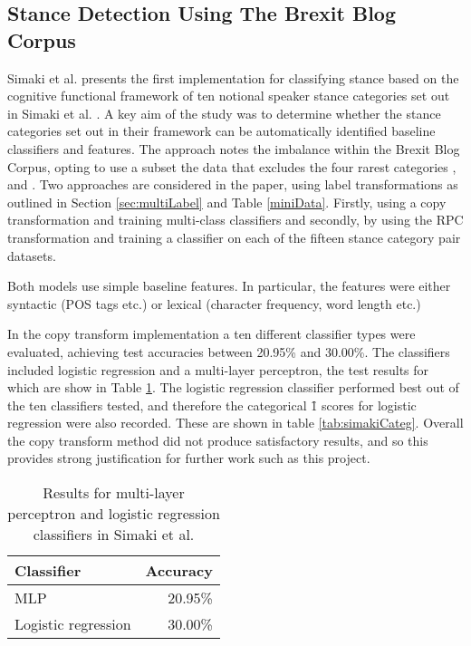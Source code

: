 \documentclass[Dissertation.tex]{subfiles}
\begin{document}
\subsection{Stance Detection Using The Brexit Blog Corpus}
Simaki et al. \cite{simakiStanceClassificationTexts2017} presents the first implementation for classifying stance based on the cognitive functional framework of ten notional speaker stance categories set out in Simaki et al. \cite{simakiAnnotatingSpeakerStance2017}. A key aim of the study was to determine whether the stance categories set out in their framework can be automatically identified baseline classifiers and features. The approach notes the imbalance within the Brexit Blog Corpus, opting to use a subset the data that excludes the four rarest categories ,  and . Two approaches are considered in the paper, using label transformations as outlined in  Section \ref{sec:multiLabel} and Table \ref{miniData}. Firstly, using a copy transformation and training multi-class classifiers and secondly, by using the RPC transformation and training a classifier on each of the fifteen stance category pair datasets. 

Both models use simple baseline features. In particular, the features were either syntactic (POS tags etc.) or lexical (character frequency, word length etc.)

In the copy transform implementation a ten different classifier types were evaluated, achieving test accuracies between 20.95\% and 30.00\%. The classifiers included logistic regression and a multi-layer perceptron, the test results for which are show in Table \ref{tab:simakiMLPLR}. The logistic regression classifier performed best out of the ten classifiers tested, and therefore the categorical \f{1} scores for logistic regression were also recorded. These are shown in table \ref{tab:simakiCateg}. Overall the copy transform method did not produce satisfactory results, and so this provides strong justification for further work such as this project.


\begin{table}
	\centering
	\caption{Results for multi-layer perceptron and logistic regression classifiers in Simaki et al. \cite{simakiStanceClassificationTexts2017}}
	\label{tab:simakiMLPLR}
	\begin{tabular}{lr}
		\toprule
		Classifier 	& 	Accuracy\\ \midrule
		MLP			&	20.95\%\\
		Logistic regression & 30.00\% \\ \bottomrule
		
	\end{tabular}
\end{table}
\end{document}
